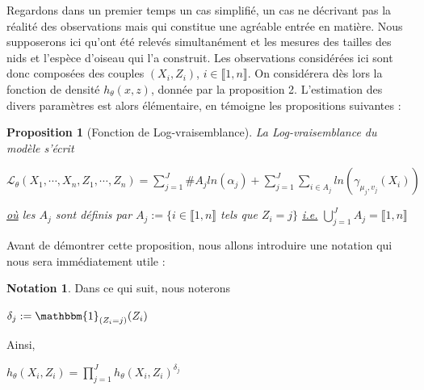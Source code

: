 \documentclass[frenchb]{report}
\newcommand{\1}{\mathbbm{1}}
\newtheorem{prop}{Proposition}
\theoremstyle{definition}\newtheorem{defn}{Définition}
\theoremstyle{definition}\newtheorem{exm}{Exemple}
\theoremstyle{definition}\newtheorem{nota}{Notation}
\theoremstyle{definition}\newtheorem{rem}{Remarque}
\begin{document}
Regardons dans un premier temps un cas simplifié, un cas ne décrivant pas la réalité des observations mais qui constitue une agréable entrée en matière. \newline
Nous supposerons ici qu'ont été relevés simultanément et les mesures des tailles des nids et l'espèce d'oiseau qui l'a construit. Les observations considérées ici sont donc composées des couples $(X_i, Z_i)$, $i \in \llbracket1,n \rrbracket$. On considérera dès lors la fonction de densité $h_\theta(x,z)$, donnée par la proposition 2. \newline
L'estimation des divers paramètres est alors élémentaire, en témoigne les propositions suivantes :
\begin{prop}[Fonction de Log-vraisemblance]
La Log-vraisemblance du modèle s'écrit
\begin{center} $\mathcal{L}_\theta(X_1, \cdots, X_n, Z_1, \cdots, Z_n) = \displaystyle \sum_{j=1}^J \#A_j ln(\alpha_j) + \sum_{j=1}^J\sum_{i\in A_j}ln(\gamma_{\mu_j, v_j}(X_i))$ \end{center}
\underline{où} les $A_j$ sont définis par $A_j := \{ i\in \llbracket1,n \rrbracket$ tels que $Z_i = j \}$ \underline{i.e.} $\displaystyle\bigcup_{j=1}^J A_j = \llbracket1,n \rrbracket$
\end{prop}
Avant de démontrer cette proposition, nous allons introduire une notation qui nous sera immédiatement utile :
\begin{nota}
Dans ce qui suit, nous noterons
\begin{center}
$\delta_j := \1_{(Z_i = j)}(Z_i)$
\end{center}
Ainsi, 
\begin{center}
$h_\theta(X_i, Z_i) = \displaystyle\prod_{j=1}^J h_\theta(X_i, Z_i)^{\delta_j}$
\end{center}
\end{nota}
\end{document}
